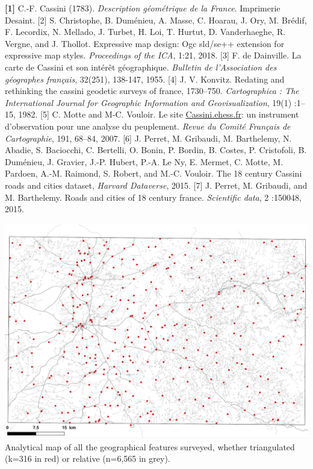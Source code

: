 \documentclass[portrait, A0]{sciposter}
\begin{document}
\begin{minipage}[b]{\textwidth}
\begin{multicols}{3}
\small
\textbf{[1]} C.-F. Cassini (1783). \textit{Description géométrique de la France}. Imprimerie Desaint.
[2] S. Christophe, B. Duménieu, A. Masse, C. Hoarau, J. Ory, M. Brédif, F. Lecordix, N. Mellado, J. Turbet, H. Loi, T. Hurtut, D. Vanderhaeghe, R. Vergne, and J. Thollot. Expressive map design: Ogc sld/se++ extension for expressive map styles. \textit{Proceedings of the ICA}, 1:21, 2018.
[3] F. de Dainville. La carte de Cassini et son intérêt géographique. \textit{Bulletin de l'Association des géographes français}, 32(251), 138-147, 1955.
[4] J. V. Konvitz. Redating and rethinking the cassini geodetic surveys of france, 1730–750. \textit{Cartographica : The International Journal for Geographic Information and Geovisualization}, 19(1) :1–15, 1982.
[5] C. Motte and M-C. Vouloir. Le site \href{http://cassini.ehess.fr}{Cassini.ehess.fr}: un instrument d’observation pour une analyse du peuplement. \textit{Revue du Comité Français de Cartographie}, 191, 68–84, 2007.
[6] J. Perret, M. Gribaudi, M. Barthelemy, N. Abadie, S. Baciocchi, C. Bertelli, O. Bonin, P. Bordin, B. Costes, P. Cristofoli, B. Duménieu, J. Gravier, J.-P. Hubert, P.-A. Le Ny, E. Mermet, C. Motte, M. Pardoen, A.-M. Raimond, S. Robert, and M.-C. Vouloir. The 18 century Cassini roads and cities dataset, \textit{Harvard Dataverse}, 2015.
[7] J. Perret, M. Gribaudi, and M. Barthelemy. Roads and cities of 18 century france. \textit{Scientific data}, 2 :150048, 2015.

\begin{center}
 \includegraphics[width=0.9\linewidth]{gfx/Triangulated.png}
 \label{map:triangulated-relative}
 \vfill
 \footnotesize
 Analytical map of all the geographical features surveyed, whether triangulated (k=316 in red) or relative (n=6,565 in grey).
\end{center}
\end{multicols}
\end{minipage}
\end{document}
